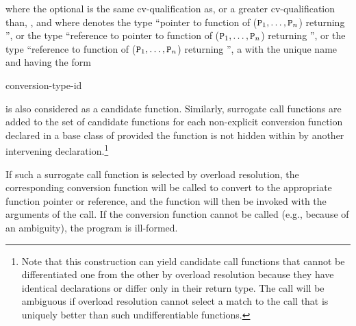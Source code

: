where the optional
is the same cv-qualification as, or a greater cv-qualification than,
\cv{},
and where
denotes the type ``pointer to function
of ($\texttt{P}_1, \dotsc, \texttt{P}_n$) returning '',
or the type ``reference to pointer to function
of ($\texttt{P}_1, \dotsc, \texttt{P}_n$) returning '',
or the type
``reference to function of ($\texttt{P}_1, \dotsc, \texttt{P}_n$)
returning '', a  with the unique name
and having the form

\begin{ncbnf}
  \terminal{(} conversion-type-id \ %
 
\end{ncbnf}

is also considered as a candidate function.
Similarly, surrogate
call functions are added to the set of candidate functions for
each non-explicit conversion function declared in a base class of
provided the function is not hidden within
by another
intervening declaration.\footnote{Note that this construction can yield
candidate call functions that cannot be
differentiated one from the other by overload resolution because they have
identical
declarations or differ only in their return type.
The call will be ambiguous
if overload
resolution cannot select a match to the call that is uniquely better than such
undifferentiable functions.}

\pnum
If such a surrogate call function is selected by overload
resolution, the corresponding conversion function will be called to convert
to the appropriate function pointer or reference, and the function
will then be invoked with the arguments of the call. If the
conversion function cannot be called (e.g., because of an ambiguity),
the program is ill-formed.

